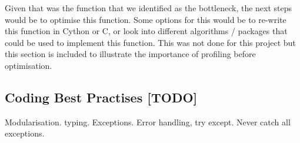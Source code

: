     Given that  was the function that we identified as the
    bottleneck, the next steps would be to optimise this function.
    Some options for this would be to re-write this function in Cython or C, or look into different algorithms / packages
    that could be used to implement this function.
    This was not done for this project but this section is included to illustrate the importance of profiling before
    optimisation.

    \subsection{Coding Best Practises [TODO]}\label{subsec:coding-best-practises}
    Modularisation.
    typing.
    Exceptions. Error handling, try except. Never catch all exceptions.
